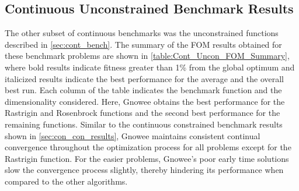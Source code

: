 \documentclass{article}                                                                           %
\begin{document}
\subsection{Continuous Unconstrained Benchmark Results} \label{con_uncon_results} 
The other subset of continuous benchmarks was the unconstrained functions described in \autoref{sec:cont_bench}.
The summary of the FOM results obtained for these benchmark problems are shown in \autoref{table:Cont_Uncon_FOM_Summary}, where bold results indicate fitness greater than 1\% from the global optimum and italicized results indicate the best performance for the average and the overall best run.
Each column of the table indicates the benchmark function and the dimensionality considered.  
Here, Gnowee obtains the best performance for the Rastrigin and Rosenbrock functions and the second best performance for the remaining functions.
Similar to the continuous constrained benchmark results shown in \autoref{sec:con_con_results}, Gnowee maintains consistent continual convergence throughout the optimization process for all problems except for the Rastrigin function.
For the easier problems, Gnowee's poor early time solutions slow the convergence process slightly, thereby hindering its performance when compared to the other algorithms. 

\pagestyle{empty}
\begin{landscape}
\begin{table}[!t]
\centering
\caption{Summary of FOM results for continuous unconstrained optimization benchmarks.}
  	\renewcommand\arraystretch{1.5} %
\label{table:Cont_Uncon_FOM_Summary}
\end{table}
\end{landscape}
\pagestyle{plain}
\end{document}
